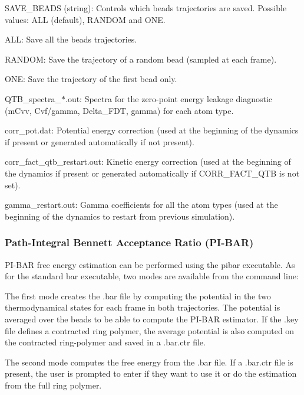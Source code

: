 \begin{DoxyItemize}
\item {\ttfamily S\-A\-V\-E\-\_\-\-B\-E\-A\-D\-S} (string)\-: Controls which beads trajectories are saved. Possible values\-: {\ttfamily A\-L\-L} (default), {\ttfamily R\-A\-N\-D\-O\-M} and {\ttfamily O\-N\-E}.
\begin{DoxyItemize}
\item {\ttfamily A\-L\-L}\-: Save all the beads trajectories.
\item {\ttfamily R\-A\-N\-D\-O\-M}\-: Save the trajectory of a random bead (sampled at each frame).
\item {\ttfamily O\-N\-E}\-: Save the trajectory of the first bead only. 


\end{DoxyItemize}
\end{DoxyItemize}


\begin{DoxyItemize}
\item {\ttfamily Q\-T\-B\-\_\-spectra\-\_\-$\ast$.out}\-: Spectra for the zero-\/point energy leakage diagnostic (m\-Cvv, Cvf/gamma, Delta\-\_\-\-F\-D\-T, gamma) for each atom type.
\item {\ttfamily corr\-\_\-pot.\-dat}\-: Potential energy correction (used at the beginning of the dynamics if present or generated automatically if not present).
\item {\ttfamily corr\-\_\-fact\-\_\-qtb\-\_\-restart.\-out}\-: Kinetic energy correction (used at the beginning of the dynamics if present or generated automatically if {\ttfamily C\-O\-R\-R\-\_\-\-F\-A\-C\-T\-\_\-\-Q\-T\-B} is not set).
\item {\ttfamily gamma\-\_\-restart.\-out}\-: Gamma coefficients for all the atom types (used at the beginning of the dynamics to restart from previous simulation). 


\end{DoxyItemize}

\subsubsection*{Path-\/\-Integral Bennett Acceptance Ratio (P\-I-\/\-B\-A\-R)}

P\-I-\/\-B\-A\-R free energy estimation can be performed using the {\ttfamily pibar} executable. As for the standard {\ttfamily bar} executable, two modes are available from the command line\-:
\begin{DoxyEnumerate}
\item The first mode creates the {\ttfamily .bar} file by computing the potential in the two thermodynamical states for each frame in both trajectories. The potential is averaged over the beads to be able to compute the P\-I-\/\-B\-A\-R estimator. If the {\ttfamily .key} file defines a contracted ring polymer, the average potential is also computed on the contracted ring-\/polymer and saved in a {\ttfamily .bar.\-ctr} file.
\item The second mode computes the free energy from the {\ttfamily .bar} file. If a {\ttfamily .bar.\-ctr} file is present, the user is prompted to enter if they want to use it or do the estimation from the full ring polymer.
\end{DoxyEnumerate}


